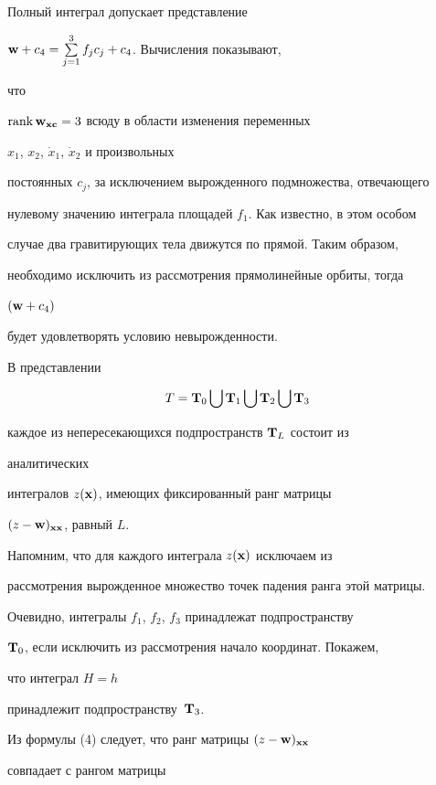 Полный интеграл допускает представление


$\bold w+c_4=\sum\limits^3_{j=1}f_j c_j+c_4$. Вычисления показывают,


что


$\operatorname{rank}\bold w_{\bold x\bold c}=3$ всюду в области изменения переменных


$x_1$, $x_2$, $\Dot x_1$, $\Dot x_2$ и произвольных


постоянных $c_j$, за исключением вырожденного подмножества, отвечающего


нулевому значению интеграла площадей $f_1$. Как известно, в этом особом


случае два гравитирующих тела движутся по прямой. Таким образом,


необходимо исключить из рассмотрения прямолинейные орбиты, тогда


$(\bold w+c_4)$


будет удовлетворять условию невырожденности.





В представлении


$$


T=\bold T_0\bigcup\bold T_1\bigcup\bold T_2\bigcup\bold T_3


$$


каждое из непересекающихся подпространств $\bold T_L$ состоит из


аналитических


интегралов $z(\bold x)$, имеющих фиксированный ранг матрицы


$(z-\bold w)_{\bold x\bold x}$, равный $L$.


Напомним, что для каждого интеграла $z(\bold x)$ исключаем из


рассмотрения вырожденное множество точек падения ранга этой матрицы.





Очевидно, интегралы $f_1$, $f_2$, $f_3$ принадлежат подпространству


$\bold T_0$, если исключить из рассмотрения начало координат. Покажем,


что интеграл $H=h$


принадлежит подпространству~$\bold T_3$.





Из формулы (4) следует, что ранг матрицы $(z-\bold w)_{\bold x\bold x}$


совпадает с рангом матрицы


